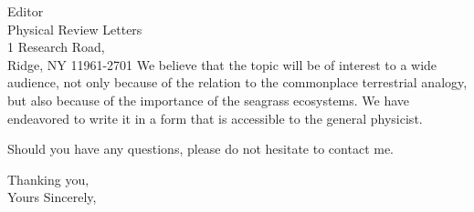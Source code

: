 \documentclass[10pt]{letter}
\begin{document}
\begin{letter}{
Editor \\
Physical Review Letters \\
1 Research Road, \\
Ridge, NY 11961-2701 
}
We believe that the topic will be of interest to a wide audience, not only because of the relation to the commonplace terrestrial analogy, but also because of the importance of the seagrass ecosystems. We have endeavored to write it in a form that is accessible to the general physicist. 

Should you have any questions, please do not hesitate to contact me.

\closing{Thanking you, \\Yours Sincerely,}

\end{letter}
\end{document}
